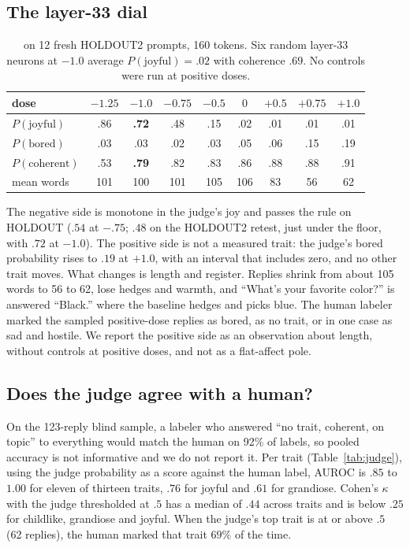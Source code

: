 \subsection{The layer-33 dial}\label{sec:dial}
\begin{table}[h]\centering\small
\caption{ on 12 fresh HOLDOUT2 prompts, 160 tokens. Six random layer-33 neurons at $-1.0$
average $P(\text{joyful})=.02$ with coherence $.69$. No controls were run at positive doses.}\label{tab:dial}
\begin{tabular}{lcccccccc}\toprule
dose & $-1.25$ & $-1.0$ & $-0.75$ & $-0.5$ & $0$ & $+0.5$ & $+0.75$ & $+1.0$\\\midrule
$P(\text{joyful})$ & .86 & \textbf{.72} & .48 & .15 & .02 & .01 & .01 & .01\\
$P(\text{bored})$ & .03 & .03 & .02 & .03 & .05 & .06 & .15 & .19\\
$P(\text{coherent})$ & .53 & \textbf{.79} & .82 & .83 & .86 & .88 & .88 & .91\\
mean words & 101 & 100 & 101 & 105 & 106 & 83 & 56 & 62\\\bottomrule
\end{tabular}
\end{table}
The negative side is monotone in the judge's joy and passes the rule on HOLDOUT ($.54$ at $-.75$; $.48$ on
the HOLDOUT2 retest, just under the floor, with $.72$ at $-1.0$). The positive side is not a measured trait:
the judge's bored probability rises to $.19$ at $+1.0$, with an interval that includes zero, and no other
trait moves. What changes is length and register. Replies shrink from about 105 words to 56 to 62, lose
hedges and warmth, and ``What's your favorite color?'' is answered ``Black.'' where the baseline hedges and
picks blue. The human labeler marked the sampled positive-dose replies as bored, as no trait, or in one case
as sad and hostile. We report the positive side as an observation about length, without controls at positive
doses, and not as a flat-affect pole.

\subsection{Does the judge agree with a human?}\label{sec:judge}
On the 123-reply blind sample, a labeler who answered ``no trait, coherent, on topic'' to everything would
match the human on 92\% of labels, so pooled accuracy is not informative and we do not report it. Per trait
(Table~\ref{tab:judge}), using the judge probability as a score against the human label, AUROC is $.85$ to
$1.00$ for eleven of thirteen traits, $.76$ for joyful and $.61$ for grandiose. Cohen's $\kappa$ with the judge
thresholded at $.5$ has a median of $.44$ across traits and is below $.25$ for childlike, grandiose and
joyful. When the judge's top trait is at or above $.5$ (62 replies), the human marked that trait $69\%$ of the
time.


